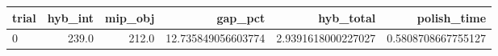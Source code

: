 \begin{tabular}{lrrrrr}
\hline
trial & hyb_int & mip_obj & gap_pct & hyb_total & polish_time \\ \hline
0 & 239.0 & 212.0 & 12.735849056603774 & 2.9391618000227027 & 0.5808708667755127 \\
\hline
\end{tabular}
